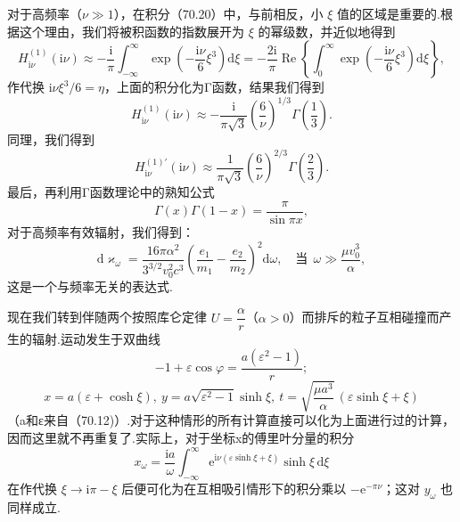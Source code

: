 对于高频率（$\nu\gg 1$），在积分（70.20）中，与前相反，小 $\xi$ 值的区域是重要的.根据这个理由，我们将被积函数的指数展开为 $\xi$ 的幂级数，并近似地得到
\begin{equation*}
  H_{\mathrm{i}\nu}^{(1)}(\mathrm{i}\nu)\approx-\frac{\mathrm{i}}{\pi}\int_{-\infty}^{\infty}\exp\left(-\frac{\mathrm{i}\nu}{6}\xi^3\right)\mathrm{d}\xi
  =-\frac{2\mathrm{i}}{\pi}\operatorname{Re}\left\{\int_0^{\infty}\exp\left(-\frac{\mathrm{i}\nu}{6}\xi^3\right)\mathrm{d}\xi\right\},
\end{equation*}
作代换 $\mathrm{i}\nu\xi^3/6=\eta$，上面的积分化为Γ函数，结果我们得到
\begin{equation*}
  H_{\mathrm{i}\nu}^{(1)}(\mathrm{i}\nu)\approx-\frac{\mathrm{i}}{\pi\sqrt{3}}\left(\frac{6}{\nu}\right)^{1/3}\Gamma\left(\frac{1}{3}\right).
\end{equation*}
同理，我们得到
\begin{equation*}
  H_{\mathrm{i}\nu}^{(1)\prime}(\mathrm{i}\nu)\approx\frac{1}{\pi\sqrt{3}}\left(\frac{6}{\nu}\right)^{2/3}\Gamma\left(\frac{2}{3}\right).
\end{equation*}
最后，再利用Γ函数理论中的熟知公式
\begin{equation*}
  \Gamma(x)\Gamma(1-x)=\frac{\pi}{\sin\pi x},
\end{equation*}
对于高频率有效辐射，我们得到：
\begin{equation}
  \mathrm{d}\varkappa_\omega=\frac{16\pi\alpha^2}{3^{3/2}v_0^2c^3}\left(\frac{e_1}{m_1}-\frac{e_2}{m_2}\right)^2\mathrm{d}\omega,\quad
  \text{当}\ \ \omega\gg\frac{\mu v_0^3}{\alpha},
\end{equation}
这是一个与频率无关的表达式.

现在我们转到伴随两个按照库仑定律 $U=\dfrac{\alpha}{r}$（$\alpha>0$）而排斥的粒子互相碰撞而产生的辐射.运动发生于双曲线
\begin{equation}
  -1+\varepsilon\cos\varphi=\frac{a(\varepsilon^2-1)}{r};
\end{equation}
\begin{equation}
  x=a(\varepsilon+\cosh\xi),\ 
  y=a\sqrt{\varepsilon^2-1}\sinh\xi,\ 
  t=\sqrt{\frac{\mu a^3}{\alpha}}\,(\varepsilon\sinh\xi+\xi)
\end{equation}
（a和ε来自（70.12)）.对于这种情形的所有计算直接可以化为上面进行过的计算，因而这里就不再重复了.实际上，对于坐标x的傅里叶分量的积分
\begin{equation*}
  x_\omega=\frac{\mathrm{i}a}{\omega}\int_{-\infty}^{\infty}\mathrm{e}^{\mathrm{i}\nu(\varepsilon\sinh\xi+\xi)}\sinh\xi\,\mathrm{d}\xi
\end{equation*}
在作代换 $\xi\to\mathrm{i}\pi-\xi$ 后便可化为在互相吸引情形下的积分乘以 $-\mathrm{e}^{-\pi\nu}$；这对 $y_\omega$ 也同样成立.

